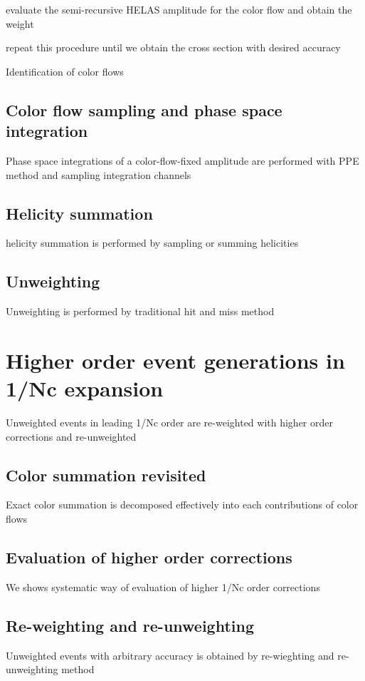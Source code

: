 \documentclass{book}
\begin{document}
evaluate the semi-recursive HELAS amplitude for the color flow and obtain the weight

repeat this procedure until we obtain the cross section with desired accuracy

Identification of color flows

\subsection{Color flow sampling and phase space integration}
Phase space integrations of a color-flow-fixed amplitude are performed with PPE method and sampling integration channels

\subsection{Helicity summation}
helicity summation is performed by sampling or summing helicities

\subsection{Unweighting}
Unweighting is performed by traditional hit and miss method

\section{Higher order event generations in 1/Nc expansion}
Unweighted events in leading 1/Nc order are re-weighted with higher order corrections and re-unweighted

\subsection{Color summation revisited}
Exact color summation is decomposed effectively into each contributions of color flows

\subsection{Evaluation of higher order corrections}
We shows systematic way of evaluation of higher 1/Nc order corrections 

\subsection{Re-weighting and re-unweighting}
Unweighted events with arbitrary accuracy is obtained by re-wieghting and re-unweighting method
\end{document}
